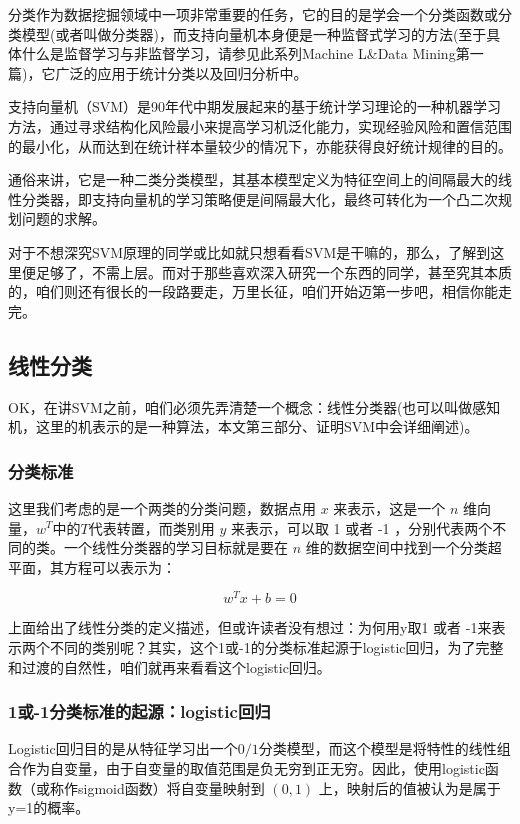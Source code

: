 \documentclass[a4paper,12pt]{article}
\begin{document}
分类作为数据挖掘领域中一项非常重要的任务，它的目的是学会一个分类函数或分类模型(或者叫做分类器)，而支持向量机本身便是一种监督式学习的方法(至于具体什么是监督学习与非监督学习，请参见此系列Machine L\&Data Mining第一篇)，它广泛的应用于统计分类以及回归分析中。

支持向量机（SVM）是90年代中期发展起来的基于统计学习理论的一种机器学习方法，通过寻求结构化风险最小来提高学习机泛化能力，实现经验风险和置信范围的最小化，从而达到在统计样本量较少的情况下，亦能获得良好统计规律的目的。

通俗来讲，它是一种二类分类模型，其基本模型定义为特征空间上的间隔最大的线性分类器，即支持向量机的学习策略便是间隔最大化，最终可转化为一个凸二次规划问题的求解。

对于不想深究SVM原理的同学或比如就只想看看SVM是干嘛的，那么，了解到这里便足够了，不需上层。而对于那些喜欢深入研究一个东西的同学，甚至究其本质的，咱们则还有很长的一段路要走，万里长征，咱们开始迈第一步吧，相信你能走完。

\subsection{线性分类}
OK，在讲SVM之前，咱们必须先弄清楚一个概念：线性分类器(也可以叫做感知机，这里的机表示的是一种算法，本文第三部分、证明SVM中会详细阐述)。

\subsubsection{分类标准}
  这里我们考虑的是一个两类的分类问题，数据点用 $ x $ 来表示，这是一个 $ n $ 维向量，$ w^T $中的$ T $代表转置，而类别用 $ y $ 来表示，可以取 1 或者 -1 ，分别代表两个不同的类。一个线性分类器的学习目标就是要在 $ n $ 维的数据空间中找到一个分类超平面，其方程可以表示为：

\begin{equation}
w^Tx+b=0
\end{equation}

上面给出了线性分类的定义描述，但或许读者没有想过：为何用y取1 或者 -1来表示两个不同的类别呢？其实，这个1或-1的分类标准起源于logistic回归，为了完整和过渡的自然性，咱们就再来看看这个logistic回归。

\subsubsection{1或-1分类标准的起源：logistic回归}
Logistic回归目的是从特征学习出一个$0/1$分类模型，而这个模型是将特性的线性组合作为自变量，由于自变量的取值范围是负无穷到正无穷。因此，使用logistic函数（或称作sigmoid函数）将自变量映射到 $ (0,1) $ 上，映射后的值被认为是属于y=1的概率。
\end{document}
